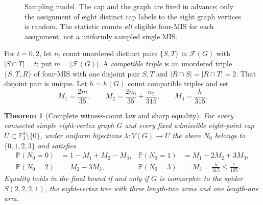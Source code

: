 \documentclass[12pt,a4paper]{article}
\newtheorem{theorem}{Theorem}[section]
\newcommand{\F}{\mathbb F}
\newcommand{\cF}{\mathcal F}
\newcommand{\PP}{\mathbb P}
\begin{document}
\begin{figure}[htbp]\centering
{}
\caption{Sampling model. The cap and the graph are fixed in advance; only the assignment of eight distinct cap labels to the eight graph vertices is random. The statistic counts \emph{all} eligible four-MIS for each assignment, not a uniformly sampled single MIS.}\label{fig:experiment}
\end{figure}

For $t=0,2$, let $n_t$ count unordered distinct pairs $\{S,T\}$ in $\cF(G)$ with $|S\cap T|=t$; put $m=|\cF(G)|$. A \emph{compatible triple} is an unordered triple $\{S,T,R\}$ of four-MIS with one disjoint pair $S,T$ and $|R\cap S|=|R\cap T|=2$. That disjoint pair is unique. Let $h=h(G)$ count compatible triples and set
\begin{equation}\label{eq:moments}
 M_1=\frac{2m}{35},\qquad M_2=\frac{2n_0}{35}+\frac{n_2}{315},\qquad M_3=\frac{h}{315}.
\end{equation}

\begin{theorem}[Complete witness-count law and sharp equality]\label{thm:main}
For every connected simple eight-vertex graph $G$ and every fixed admissible eight-point cap $U\subset\F_3^3\setminus\{0\}$, under uniform bijections $\lambda:V(G)\to U$ the above $N_0$ belongs to $\{0,1,2,3\}$ and satisfies
\begin{equation}\label{eq:law}
\begin{aligned}
\PP(N_0=0)&=1-M_1+M_2-M_3, & \PP(N_0=1)&=M_1-2M_2+3M_3,\\
\PP(N_0=2)&=M_2-3M_3, & \PP(N_0=3)&=M_3=\frac{h}{315}\le\frac1{105}.
\end{aligned}
\end{equation}
Equality holds in the final bound \emph{if and only if} $G$ is isomorphic to the spider $S(2,2,2,1)$, the eight-vertex tree with three length-two arms and one length-one arm.
\end{theorem}
\end{document}
